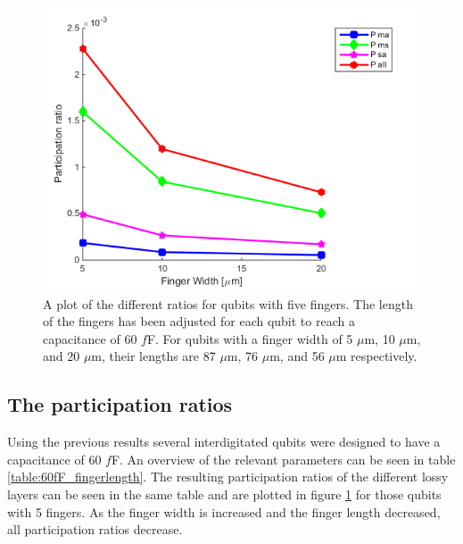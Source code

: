  \begin{figure}
 	\centering
 	\includegraphics[scale = 0.7]{Figures/Ratio_plots/FingerWidth_legend}
 	\caption{A plot of the different ratios for qubits with five fingers.  The length of the fingers has been adjusted for each qubit to reach a capacitance of 60 \(f\)F. For qubits with a finger width of  5 \(\mu\)m, 10 \(\mu\)m, and 20 \(\mu\)m, their lengths are 87 \(\mu\)m, 76 \(\mu\)m, and 56 \(\mu\)m  respectively.}
 	\label{fig:FingerWidth_legend}
 \end{figure}

\subsection{The participation ratios}
Using the previous results several interdigitated qubits were designed to have a capacitance of 60 \(f\)F. An overview of the relevant parameters can be seen in table \ref{table:60fF_fingerlength}. The resulting participation ratios of the different lossy layers can be seen in the same table and are plotted in figure \ref{fig:FingerWidth_legend} for those qubits with 5 fingers. As the finger width is increased and the finger length decreased, all participation ratios decrease.

